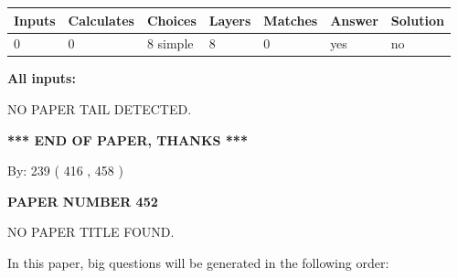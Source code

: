 \documentclass[12pt]{article}
\begin{document}
 
\noindent{}
 
 
   
   
   
   
\noindent\begin{tabular}{|l|l|l|l|l|l|l|}
 \hline
Inputs & Calculates & Choices & Layers & Matches & Answer & Solution \\ \hline
 0  & 
 0  & 
 8
  simple  
  & 
 8  & 
 0  & 
  yes & 
  no 
  \\ \hline
 \end{tabular}
   
   
   
   
\noindent{}
   
   
   
   
\noindent\vspace{0.1in}\hspace{-0.08in} {\textbf{\Large{All inputs: }}}
   
   
   
   
\vspace{2.0in} NO PAPER TAIL DETECTED.
   
   
   
   
\vspace{1.0in} 
{\textbf{\large{ *** END OF PAPER, THANKS *** }}} 
   
   
\hspace{1.0in} By: 
 239 ( 416 ,  458 )
   
   
   
   
\newpage 
\setcounter{page}{ 
   452001 } 
   
   
   
   
 {\textbf{ \Large{ PAPER NUMBER  452  }}}
   
   
\vspace{0.2in}
   
   
   
   
   
   
 NO PAPER TITLE FOUND.
   
   
   
\vspace{0.2in}
   
In this paper, big questions will be generated in the following order: 
   
\end{document}
